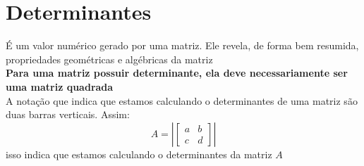 \documentclass{article}
\begin{document}
\section{Determinantes}
É um valor numérico gerado por uma matriz. Ele revela, de forma bem resumida, propriedades geométricas e algébricas da matriz
\\[5pt]
\textbf{Para uma matriz possuir determinante, ela deve necessariamente ser uma matriz quadrada}
\\[5pt]
A notação que indica que estamos calculando o determinantes de uma matriz são duas barras verticais. Assim:
\[ A=
\left|
\begin{bmatrix}
    a & b \\
    c & d 
\end{bmatrix}
\right|
\] isso indica que estamos calculando o determinantes da matriz $A$
\end{document}
